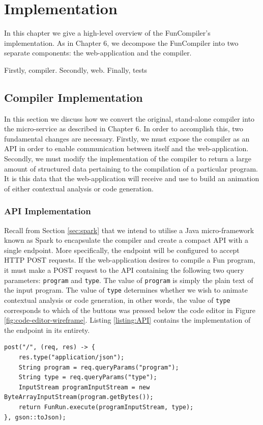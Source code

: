 \documentclass{l4proj}
\begin{document}
\chapter{Implementation}
In this chapter we give a high-level overview of the FunCompiler's implementation. As in Chapter 6, we decompose the FunCompiler into two separate components: the web-application and the compiler. 

Firstly, compiler. Secondly, web. Finally, tests

\section{Compiler Implementation}
In this section we discuss how we convert the original, stand-alone compiler into the micro-service as described in Chapter 6.  In order to accomplish this, two fundamental changes are necessary. Firstly, we must expose the compiler as an API in order to enable communication between itself and the web-application. Secondly, we must modify the implementation of the compiler to return a large amount of structured data pertaining to the compilation of a particular program. It is this data that the web-application will receive and use to build an animation of either contextual analysis or code generation.

\subsection{API Implementation}
Recall from Section \ref{sec:spark} that we intend to utilise a Java micro-framework known as Spark to encapsulate the compiler and create a compact API with a single endpoint. More specifically, the endpoint will be configured to accept HTTP POST requests. If the web-application desires to compile a Fun program, it must make a POST request to the API containing the following two query parameters: \texttt{program} and \texttt{type}. The value of \texttt{program} is simply the plain text of the input program. The value of \texttt{type} determines whether we wish to animate contextual analysis or code generation, in other words, the value of \texttt{type} corresponds to which of the buttons was pressed below the code editor in Figure \ref{fig:code-editor-wireframe}. Listing \ref{listing:API} contains the implementation of the endpoint in its entirety.
\begin{lstlisting}[language=myjava, caption=API implementation, label=listing:API]
post("/", (req, res) -> {
	res.type("application/json");
	String program = req.queryParams("program");
 	String type = req.queryParams("type");
	InputStream programInputStream = new ByteArrayInputStream(program.getBytes());
	return FunRun.execute(programInputStream, type);
}, gson::toJson);
\end{lstlisting} 
\end{document}
